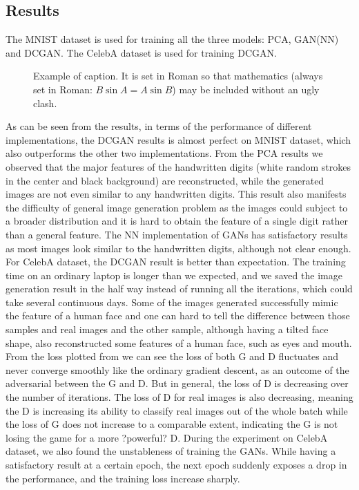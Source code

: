 \documentclass[10pt,twocolumn,letterpaper]{article}
\begin{document}
\subsection{Results}
The MNIST dataset is used for training all the three models: PCA, GAN(NN) and DCGAN.
The CelebA dataset is used for training DCGAN.
\begin{figure}[t]
\begin{center}
\fbox{\rule{0pt}{2in} \rule{0.9\linewidth}{0pt}}
\end{center}
   \caption{Example of caption.  It is set in Roman so that mathematics
   (always set in Roman: $B \sin A = A \sin B$) may be included without an
   ugly clash.}
\label{fig:long}
\label{fig:onecol}
\end{figure}
As can be seen from the results, in terms of the performance of different implementations, the DCGAN results is almost perfect on MNIST dataset, which also outperforms the other two implementations. From the PCA results we observed that the major features of the handwritten digits (white random strokes in the center and black background) are reconstructed, while the generated images are not even similar to any handwritten digits. This result also manifests the difficulty of general image generation problem as the images could subject to a broader distribution and it is hard to obtain the feature of a single digit rather than a general feature. The NN implementation of GANs has satisfactory results as most images look similar to the handwritten digits, although not clear enough. 
For CelebA dataset, the DCGAN result is better than expectation. The training time on an ordinary laptop is longer than we expected, and we saved the image generation result in the half way instead of running all the iterations, which could take several continuous days. Some of the images generated successfully mimic the feature of a human face and one can hard to tell the difference between those samples and real images and the other sample, although having a tilted face shape, also reconstructed some features of a human face, such as eyes and mouth.
From the loss plotted from we can see the loss of both G and D fluctuates and never converge smoothly like the ordinary gradient descent, as an outcome of the adversarial between the G and D. But in general, the loss of D is decreasing over the number of iterations. The loss of D for real images is also decreasing, meaning the D is increasing its ability to classify real images out of the whole batch while the loss of G does not increase to a comparable extent, indicating the G is not losing the game for a more ?powerful? D.
During the experiment on CelebA dataset, we also found the unstableness of training the GANs. While having a satisfactory result at a certain epoch, the next epoch suddenly exposes a drop in the performance, and the training loss increase sharply.
\end{document}
